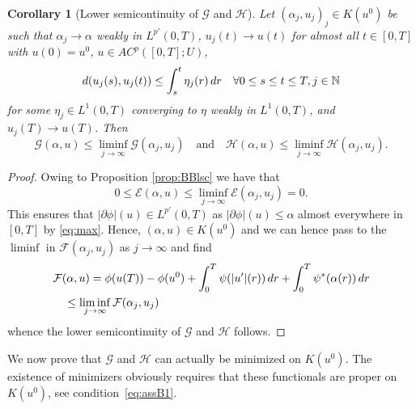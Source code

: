 \documentclass[10pt,a4paper]{amsart}
\newcommand{\Nz}{\mathbb{N}}
\newcommand{\dr}{{\rm d} r}
\renewcommand{\sl}{|\partial \phi|}
\newcommand{\GG}{{\mathcal G}}
\newcommand{\EE}{{\mathcal E}}
\newcommand{\FF}{{\mathcal F}}
\newcommand{\HH}{{\mathcal H}}
\newtheorem{corollary}[theorem]{Corollary}
\begin{document}
\begin{corollary}[Lower semicontinuity of $\GG$  and $\HH$]\label{prop:FFlsc}
  Let $(\alpha_j,u_j)_j \in K(u^0) $ be  such that
  $\alpha_j \to \alpha$ weakly in  $L^{p'}(0,T)$,   $u_j(t)
  \to u(t)$ for  almost  all $t\in[0,T]$  with $u(0)=u^0$, $u \in AC^p([0,T];U)$,
  \[
 d(u_j(s), u_j(t)) \le \int_s^t \eta_j(r) \,\dr \quad \forall 0 \le s \le t \le T, j \in \Nz
  \]
for some $\eta_j \in L^1(0,T)$ converging to $\eta$ weakly in $L^1(0,T)$, and $u_j(T) \to u(T)$. Then  
  \begin{equation*}
    \GG(\alpha,u)\leq \liminf_{j\to \infty}
    \GG(\alpha_j,u_j)\quad  \text{and} \quad \HH(\alpha,u)\leq \liminf_{j\to \infty}
    \HH(\alpha_j,u_j).
  \end{equation*} 
\end{corollary}
\begin{proof}
Owing to Proposition \ref{prop:BBlsc} we have
that
$$0\leq \EE (\alpha,u) \leq \liminf_{j \to \infty}\EE(\alpha_j ,
u_j) =0.$$
This ensures that $\sl(u) \in L^{p'}(0,T)$ as $ \sl(u)\leq \alpha$ almost
everywhere in $[0,T]$  by \eqref{eq:max}.
 Hence, $(\alpha,u)\in
K(u^0)$ and we can hence pass to the $\liminf$ in
$\FF(\alpha_j,u_j)$ as $j
\to \infty$ and find
\begin{align}
  &\FF(\alpha,u)  =  \phi(u(T))-\phi(u^0) +   \int_0^T \psi(|u'|(r))\,
    \dr +  \int_0^T \psi^*(\alpha(r))\, \dr \nonumber\\
  &\quad \leq \liminf_{j\to \infty}\FF(\alpha_j,u_j)\label{eq:lscdopo}
\end{align}
whence the  lower semicontinuity of $\GG$  and $\HH$  follows.
\end{proof}


We now   prove that  $
\GG$ and $\HH$ can actually be minimized on  $K(u^0)$.  The existence
of minimizers  obviously requires that  these functionals are  proper on $K(u^0)$, see condition~\eqref{eq:assB1}.  
\end{document}
